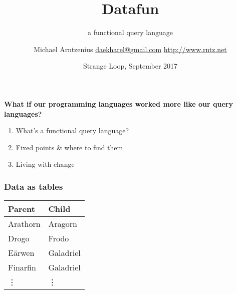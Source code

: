 \documentclass[xcolor=table]{beamer}
\title{Datafun}
\subtitle{a functional query language}
\author{Michael Arntzenius
  \newline\href{mailto:daekharel@gmail.com}{daekharel@gmail.com}
  \newline\url{http://www.rntz.net}}
\date{Strange Loop, September 2017}
\begin{document}
\maketitle


\begin{frame}\Large
  \center \textbf{What if our programming languages worked more like our query
  languages?}
\end{frame}

\begin{frame}\Large
  \begin{enumerate}
    \itemsep 1.5em
  \item What's a functional query language?
  \item Fixed points \& where to find them
  \item Living with change
  \end{enumerate}
\end{frame}

\begin{frame}
  \frametitle{Data as tables}

  \begin{center}
    \begin{tabular}{l|l}
      \textbf{Parent} & \textbf{Child}\\\hline
      Arathorn & Aragorn\\
      Drogo & Frodo\\
      E\"arwen & Galadriel\\
      Finarfin & Galadriel\\
      \rowcolor{white}
      \hfill\vdots & \hfill\vdots
    \end{tabular}
  \end{center}
\end{frame}
\end{document}
